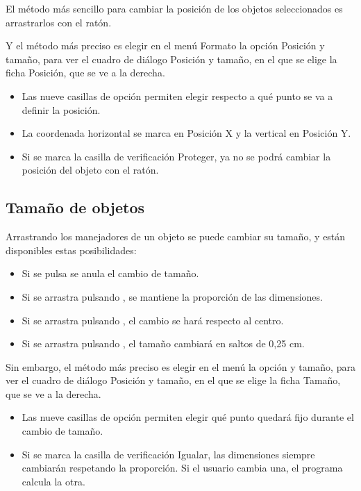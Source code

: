 El método más sencillo para cambiar la posición de los objetos
seleccionados es arrastrarlos con el ratón.

Y el método más preciso es elegir en el menú Formato la opción
Posición y tamaño, para ver el cuadro de diálogo Posición y tamaño, en
el que se elige la ficha Posición, que se ve a la derecha.

\begin{itemize}
\item Las nueve casillas de opción permiten elegir respecto a qué 
punto se va a definir la posición.

\item La coordenada horizontal se marca en Posición X y la vertical 
en Posición Y.

\item Si se marca la casilla de verificación Proteger, ya no se 
podrá cambiar la posición del objeto con el ratón.
\end{itemize}

\subsection{Tamaño de objetos}

Arrastrando los manejadores de un objeto se puede cambiar su tamaño, y
están disponibles estas posibilidades:

\begin{itemize}
\item Si se pulsa  se anula el cambio de tamaño.

\item Si se arrastra pulsando , se mantiene la proporción 
de las dimensiones.

\item Si se arrastra pulsando , el cambio se hará respecto 
al centro.

\item Si se arrastra pulsando , el tamaño cambiará en 
saltos de 0,25 cm. 
\end{itemize}

Sin embargo, el método más preciso es elegir en el menú 
la opción  y tamaño, para ver el cuadro de diálogo
Posición y tamaño, en el que se elige la ficha Tamaño, que se ve a la
derecha.

\begin{itemize}
\item Las nueve casillas de opción permiten elegir qué punto 
quedará fijo durante el cambio de tamaño.

\item Si se marca la casilla de verificación Igualar, las dimensiones 
siempre cambiarán respetando la proporción. Si el usuario cambia una,
 el programa calcula la otra.
\end{itemize}

